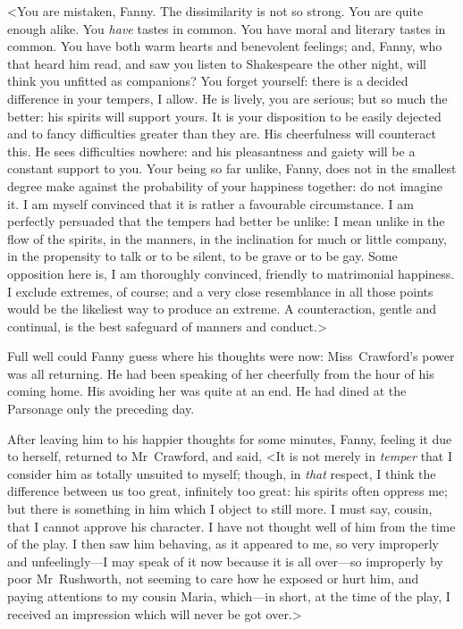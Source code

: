 <You are mistaken, Fanny. The dissimilarity is not so strong. You are quite enough alike. You \textit{have}  tastes in common. You have moral and literary tastes in common. You have both warm hearts and benevolent feelings; and, Fanny, who that heard him read, and saw you listen to Shakespeare the other night, will think you unfitted as companions? You forget yourself: there is a decided difference in your tempers, I allow. He is lively, you are serious; but so much the better: his spirits will support yours. It is your disposition to be easily dejected and to fancy difficulties greater than they are. His cheerfulness will counteract this. He sees difficulties nowhere: and his pleasantness and gaiety will be a constant support to you. Your being so far unlike, Fanny, does not in the smallest degree make against the probability of your happiness together: do not imagine it. I am myself convinced that it is rather a favourable circumstance. I am perfectly persuaded that the tempers had better be unlike: I mean unlike in the flow of the spirits, in the manners, in the inclination for much or little company, in the propensity to talk or to be silent, to be grave or to be gay. Some opposition here is, I am thoroughly convinced, friendly to matrimonial happiness. I exclude extremes, of course; and a very close resemblance in all those points would be the likeliest way to produce an extreme. A counteraction, gentle and continual, is the best safeguard of manners and conduct.>

Full well could Fanny guess where his thoughts were now: Miss~Crawford's power was all returning. He had been speaking of her cheerfully from the hour of his coming home. His avoiding her was quite at an end. He had dined at the Parsonage only the preceding day.

After leaving him to his happier thoughts for some minutes, Fanny, feeling it due to herself, returned to Mr~Crawford, and said, <It is not merely in \textit{temper}  that I consider him as totally unsuited to myself; though, in \textit{that}  respect, I think the difference between us too great, infinitely too great: his spirits often oppress me; but there is something in him which I object to still more. I must say, cousin, that I cannot approve his character. I have not thought well of him from the time of the play. I then saw him behaving, as it appeared to me, so very improperly and unfeelingly—I may speak of it now because it is all over—so improperly by poor Mr~Rushworth, not seeming to care how he exposed or hurt him, and paying attentions to my cousin Maria, which—in short, at the time of the play, I received an impression which will never be got over.>


